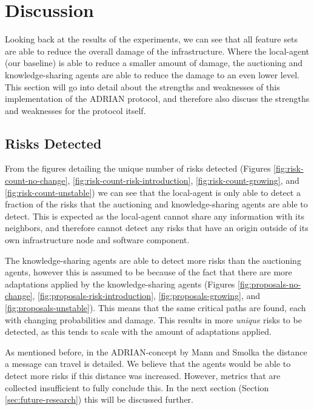 \section{Discussion}
\label{sec:discussion}
Looking back at the results of the experiments, we can see that all feature sets are able to reduce the overall damage of the infrastructure. Where the local-agent (our baseline) is able to reduce a smaller amount of damage, the auctioning and knowledge-sharing agents are able to reduce the damage to an even lower level. This section will go into detail about the strengths and weaknesses of this implementation of the ADRIAN protocol, and therefore also discuss the strengths and weaknesses for the protocol itself. 

\subsection{Risks Detected}
\label{ssec:risks-detected}
From the figures detailing the unique number of risks detected (Figures \ref{fig:risk-count-no-change}, \ref{fig:risk-count-risk-introduction}, \ref{fig:risk-count-growing}, and \ref{fig:risk-count-unstable}) we can see that the local-agent is only able to detect a fraction of the risks that the auctioning and knowledge-sharing agents are able to detect. This is expected as the local-agent cannot share any information with its neighbors, and therefore cannot detect any risks that have an origin outside of its own infrastructure node and software component.

The knowledge-sharing agents are able to detect more risks than the auctioning agents, however this is assumed to be because of the fact that there are more adaptations applied by the knowledge-sharing agents (Figures \ref{fig:proposals-no-change}, \ref{fig:proposals-risk-introduction}, \ref{fig:proposals-growing}, and \ref{fig:proposals-unstable}). This means that the same critical paths are found, each with changing probabilities and damage. This results in more \emph{unique} risks to be detected, as this tends to scale with the amount of adaptations applied. 

As mentioned before, in the ADRIAN-concept by Mann and Smolka \cite{mann2023ADRIAN} the distance a message can travel is detailed. We believe that the agents would be able to detect more risks if this distance was increased. However, metrics that are collected insufficient to fully conclude this. In the next section (Section \ref{sec:future-research}) this will be discussed further.

